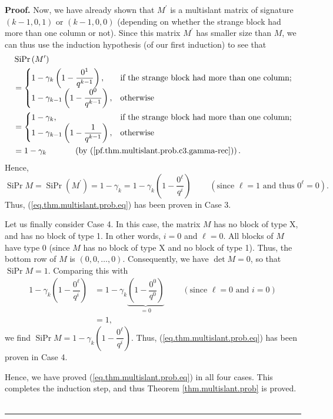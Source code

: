 \documentclass[numbers=enddot,12pt,final,onecolumn,notitlepage]{scrartcl}%
\theoremstyle{definition}
\newenvironment{proof}[1][Proof]{\noindent\textbf{#1.} }{\ \rule{0.5em}{0.5em}}
\theoremstyle{plainsl}
\begin{document}
\begin{proof}
Now, we have already shown that $M^{\prime}$ is a multislant matrix of
signature $\left(  k-1,0,1\right)  $ or $\left(  k-1,0,0\right)  $ (depending
on whether the strange block had more than one column or not). Since this
matrix $M^{\prime}$ has smaller size than $M$, we can thus use the induction
hypothesis (of our first induction) to see that%
\begin{align*}
&  \operatorname*{SiPr}\left(  M^{\prime}\right) \\
&  =%
\begin{cases}
1-\gamma_{k}\left(  1-\dfrac{0^{1}}{q^{k-1}}\right)  , & \text{if the strange
block had more than one column};\\
1-\gamma_{k-1}\left(  1-\dfrac{0^{0}}{q^{k-1}}\right)  , & \text{otherwise}%
\end{cases}
\\
&  =%
\begin{cases}
1-\gamma_{k}, & \text{if the strange block had more than one column};\\
1-\gamma_{k-1}\left(  1-\dfrac{1}{q^{k-1}}\right)  , & \text{otherwise}%
\end{cases}
\\
&  =1-\gamma_{k}\ \ \ \ \ \ \ \ \ \ \left(  \text{by
(\ref{pf.thm.multislant.prob.c3.gamma-rec})}\right)  .
\end{align*}
Hence,%
\[
\operatorname*{SiPr}M=\operatorname*{SiPr}\left(  M^{\prime}\right)
=1-\gamma_{k}=1-\gamma_{k}\left(  1-\dfrac{0^{\ell}}{q^{i}}\right)
\ \ \ \ \ \ \ \ \ \ \left(  \text{since }\ell=1\text{ and thus }0^{\ell
}=0\right)  .
\]
Thus, (\ref{eq.thm.multislant.prob.eq}) has been proven in Case 3.

Let us finally consider Case 4. In this case, the matrix $M$ has no block of
type X, and has no block of type 1. In other words, $i=0$ and $\ell=0$. All
blocks of $M$ have type 0 (since $M$ has no block of type X and no block of
type 1). Thus, the bottom row of $M$ is $\left(  0,0,\ldots,0\right)  $.
Consequently, we have $\det M=0$, so that $\operatorname*{SiPr}M=1$. Comparing
this with%
\begin{align*}
1-\gamma_{k}\left(  1-\dfrac{0^{\ell}}{q^{i}}\right)   &  =1-\gamma
_{k}\underbrace{\left(  1-\dfrac{0^{0}}{q^{0}}\right)  }_{=0}%
\ \ \ \ \ \ \ \ \ \ \left(  \text{since }\ell=0\text{ and }i=0\right) \\
&  =1,
\end{align*}
we find $\operatorname*{SiPr}M=1-\gamma_{k}\left(  1-\dfrac{0^{\ell}}{q^{i}%
}\right)  $. Thus, (\ref{eq.thm.multislant.prob.eq}) has been proven in Case 4.

Hence, we have proved (\ref{eq.thm.multislant.prob.eq}) in all four cases.
This completes the induction step, and thus Theorem \ref{thm.multislant.prob}
is proved.
\end{proof}
\end{document}
